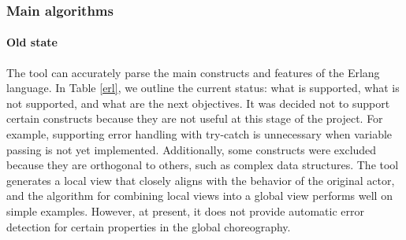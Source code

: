 \subsubsection{Main algorithms}


\paragraph{Old state}

The tool can accurately parse the main constructs and features of the Erlang language. In Table \ref{erl}, we outline the current status: what is supported, what is not supported, and what are the next objectives. It was decided not to support certain constructs because they are not useful at this stage of the project. For example, supporting error handling with try-catch is unnecessary when variable passing is not yet implemented. Additionally, some constructs were excluded because they are orthogonal to others, such as complex data structures. The tool generates a local view that closely aligns with the behavior of the original actor, and the algorithm for combining local views into a global view performs well on simple examples. However, at present, it does not provide automatic error detection for certain properties in the global choreography.

